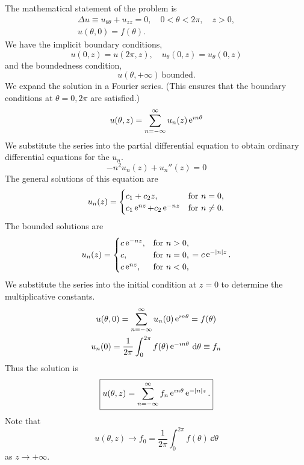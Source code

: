 {%
\begin{Solution}
The mathematical statement of the problem is
\begin{gather*}
  \Delta u \equiv u_{\theta \theta} + u_{z z} = 0, \quad 0 < \theta < 2 \pi, \quad z > 0, 
  \\
  u(\theta, 0) = f(\theta).
\end{gather*}
We have the implicit boundary conditions,
\[
u(0, z) = u(2 \pi, z), \quad u_\theta(0, z) = u_\theta(0, z)
\]
and the boundedness condition,
\[
u(\theta, +\infty)\ \mathrm{bounded}.
\]
We expand the solution in a Fourier series. (This ensures that the boundary 
conditions at $\theta = 0, 2\pi$ are satisfied.)
\[
u(\theta, z) = \sum_{n = -\infty}^\infty u_n(z) \mathop{\mathrm{e}}\nolimits^{\imath n \theta}
\]
We substitute the series into the partial differential equation to obtain
ordinary differential equations for the $u_n$.
\[
-n^2 u_n(z) + u_n''(z) = 0
\]
The general solutions of this equation are
\[
u_n(z) = \begin{cases}
  c_1 + c_2 z, &\mathrm{for}\ n = 0, \\
  c_1 \mathop{\mathrm{e}}\nolimits^{n z} + c_2 \mathop{\mathrm{e}}\nolimits^{-n z} &\mathrm{for}\ n \neq 0.
\end{cases}
\]
The bounded solutions are
\[
u_n(z) = \begin{cases}
  c \mathop{\mathrm{e}}\nolimits^{-n z}, &\mathrm{for}\ n > 0, \\
  c,      &\mathrm{for}\ n = 0, \\
  c \mathop{\mathrm{e}}\nolimits^{n z}, &\mathrm{for}\ n < 0,
\end{cases}
= c \mathop{\mathrm{e}}\nolimits^{-|n| z}.
\]
We substitute the series into the initial condition at $z = 0$ to determine
the multiplicative constants.
\begin{gather*}
  u(\theta, 0) = \sum_{n = -\infty}^\infty u_n(0) \mathop{\mathrm{e}}\nolimits^{\imath n \theta} = f(\theta) 
  \\
  u_n(0) = \frac{1}{2 \pi} \int_0^{2 \pi} f(\theta) \mathop{\mathrm{e}}\nolimits^{-\imath n \theta} \,\mathrm{d} \theta \equiv f_n
\end{gather*}
Thus the solution is
\[
\boxed{
  u(\theta, z) = \sum_{n = -\infty}^\infty f_n \mathop{\mathrm{e}}\nolimits^{\imath n \theta} \mathop{\mathrm{e}}\nolimits^{-|n| z}.
}
\]
Note that
\[
u(\theta, z) \to f_0 = \frac{1}{2 \pi} \int_0^{2 \pi} f(\theta)\,\dd \theta
\]
as $z \to +\infty$.
\end{Solution}













}
